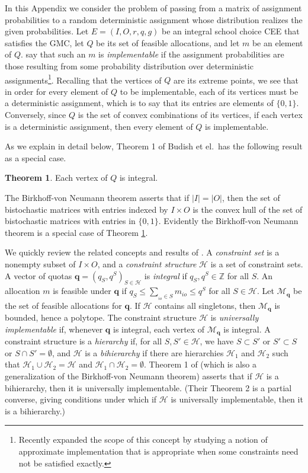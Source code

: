 \documentclass[12pt, A4paper]{article}
\theoremstyle{definition}
\newtheorem{thm}{Theorem}
\newcommand{\In}{\mathbb{Z}}
\newcommand{\bq}{\mathbf{q}}
\newcommand{\cH}{\mathcal{H}}
\newcommand{\cM}{\mathcal{M}}
\begin{document}
\begin{appendix}
In this Appendix we consider the problem of passing from a matrix of assignment probabilities to a random deterministic assignment whose distribution realizes the given probabilities.
Let $E = (I,O,r,q,g)$ be an integral school choice CEE that satisfies the GMC, let $Q$ be its set of feasible allocations, and let $m$ be an element of $Q$.    \cite{bckm13aer} say that such an $m$ is \emph{implementable} if the assignment probabilities are those resulting from some probability distribution over deterministic assignments\footnote{Recently \cite{AkNi20} expanded the scope of this concept by studying a notion of approximate implementation that is appropriate when some constraints need not be satisfied exactly.}.  Recalling that the vertices of $Q$ are its extreme points, we see that in order for every element of $Q$ to be implementable, each of its vertices must be a deterministic assignment, which is to say that its entries are elements of $\{0,1\}$.  Conversely, since $Q$ is the set of convex combinations of its vertices, if each vertex is a deterministic assignment, then every element of $Q$ is implementable.

As we explain in detail below, Theorem 1 of  Budish et el.~has the following result as a special case.

\begin{thm} \label{th:Implementability}
  Each vertex of $Q$ is integral.
\end{thm}

The Birkhoff-von Neumann theorem asserts that if $|I| = |O|$, then the set of bistochastic matrices with entries indexed by $I \times O$ is the convex hull of the set of bistochastic matrices with entries in $\{0,1\}$.   Evidently the Birkhoff-von Neumann theorem is a special case of Theorem \ref{th:Implementability}. 

We quickly review the related concepts and results of \cite{bckm13aer}.   A \emph{constraint set} is a nonempty subset of $I \times O$, and a \emph{constraint structure} $\cH$ is a set of constraint sets.  A vector of quotas $\bq = (q_S,q^S)_{S \in \cH}$ is \emph{integral} if $q_S,q^S \in \In$ for all $S$.
An allocation $m$ is feasible under $\bq$ if $q_S \le \sum_{_{io} \in S} m_{io} \le q^S$ for all $S \in \cH$.  Let $\cM_\bq$ be the set of feasible allocations for $\bq$. If $\cH$ contains all singletons, then $\cM_\bq$ is bounded, hence a polytope. The constraint structure $\cH$ is \emph{universally implementable} if, whenever $\bq$ is integral, each vertex of $\cM_\bq$ is integral.  A constraint structure is a \emph{hierarchy} if, for all $S, S' \in \cH$, we have $S \subset S'$ or $S' \subset S$ or $S \cap S' = \emptyset$, and $\cH$ is a \emph{bihierarchy} if there are hierarchies $\cH_1$ and $\cH_2$ such that $\cH_1 \cup \cH_2 = \cH$ and $\cH_1 \cap \cH_2 = \emptyset$.  Theorem 1 of \cite{bckm13aer} (which is also a generalization of the Birkhoff-von Neumann theorem) asserts that if $\cH$ is a bihierarchy, then it is universally implementable.  (Their Theorem 2 is a partial converse, giving conditions under which if $\cH$ is universally implementable, then it is a bihierarchy.)


\end{appendix}
\end{document}
